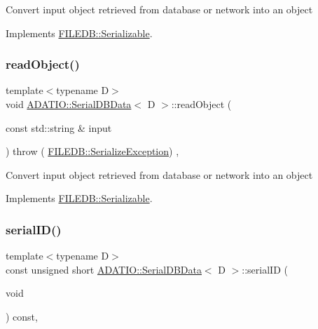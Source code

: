 Convert input object retrieved from database or network into an object 

Implements \mbox{\hyperlink{classFILEDB_1_1Serializable_a21a5831fa4f65790490a8a5eba9fcab2}{F\+I\+L\+E\+D\+B\+::\+Serializable}}.

\mbox{\label{classADATIO_1_1SerialDBData_a2f7405b96f413b1787fc2072b8932c20}} 
\subsubsection{\texorpdfstring{readObject()}{readObject()}\hspace{0.1cm}{\footnotesize\ttfamily [2/2]}}
{\footnotesize\ttfamily template$<$typename D$>$ \\
void \mbox{\hyperlink{classADATIO_1_1SerialDBData}{A\+D\+A\+T\+I\+O\+::\+Serial\+D\+B\+Data}}$<$ D $>$\+::read\+Object (\begin{DoxyParamCaption}\item[{const std\+::string \&}]{input }\end{DoxyParamCaption}) throw ( \mbox{\hyperlink{classFILEDB_1_1SerializeException}{F\+I\+L\+E\+D\+B\+::\+Serialize\+Exception}}) \hspace{0.3cm}{\ttfamily [inline]}, {\ttfamily [virtual]}}

Convert input object retrieved from database or network into an object 

Implements \mbox{\hyperlink{classFILEDB_1_1Serializable_a21a5831fa4f65790490a8a5eba9fcab2}{F\+I\+L\+E\+D\+B\+::\+Serializable}}.

\mbox{\label{classADATIO_1_1SerialDBData_a513643be38434a570d655602330aade9}} 
\subsubsection{\texorpdfstring{serialID()}{serialID()}\hspace{0.1cm}{\footnotesize\ttfamily [1/2]}}
{\footnotesize\ttfamily template$<$typename D$>$ \\
const unsigned short \mbox{\hyperlink{classADATIO_1_1SerialDBData}{A\+D\+A\+T\+I\+O\+::\+Serial\+D\+B\+Data}}$<$ D $>$\+::serial\+ID (\begin{DoxyParamCaption}\item[{void}]{ }\end{DoxyParamCaption}) const\hspace{0.3cm}{\ttfamily [inline]}, {\ttfamily [virtual]}}

